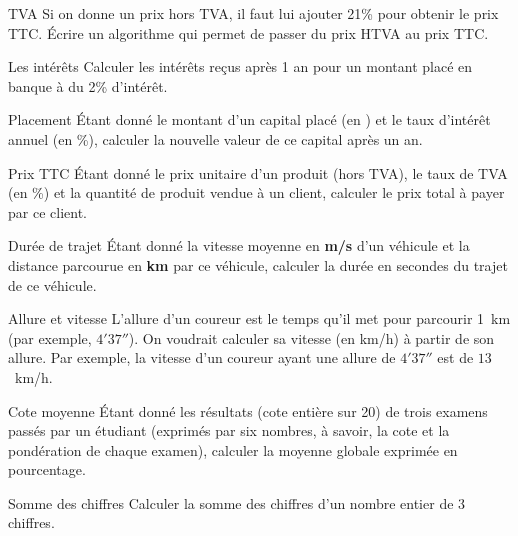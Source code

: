 		\begin{Exercice}{TVA}
			Si on donne un prix hors TVA, il faut lui ajouter 21\% 
			pour obtenir le prix TTC. Écrire un algorithme qui permet 
			de passer du prix HTVA au prix TTC.
		\end{Exercice}
	
		\begin{Exercice}{Les intérêts}
			Calculer les intérêts reçus après 1 an pour un montant placé en 
			banque à du 2\% d’intérêt.
		\end{Exercice}
	
		\begin{Exercice}{Placement}
			Étant donné le montant d’un capital placé (en \texteuro) 
			et le taux d’intérêt annuel (en \%), 
			calculer la nouvelle valeur de ce capital après un an.
		\end{Exercice}
	
		\begin{Exercice}{Prix TTC}
			Étant donné le prix unitaire d’un produit
			(hors TVA), le taux de TVA (en \%) et la quantité de produit vendue à
			un client, calculer le prix total à payer par ce client.
		\end{Exercice}
	
		\begin{Exercice}{Durée de trajet}
			Étant donné la vitesse moyenne en \textbf{m/s}
			d’un véhicule et la distance parcourue en \textbf{km} par ce véhicule,
			calculer la durée en secondes du trajet de ce véhicule.
		\end{Exercice}
	
		\begin{Exercice}{Allure et vitesse}
			L’allure d’un coureur est le temps qu’il met pour parcourir 1~km
			(par exemple, $4'37''$).
			On voudrait calculer sa vitesse (en km/h) à partir de son allure.
			Par exemple, la vitesse d’un coureur ayant une allure de
			$4'37''$ est de $13$~km/h. 
		\end{Exercice}
	
		\begin{Exercice}{Cote moyenne}
			Étant donné les résultats (cote entière sur
			20) de trois examens passés par un étudiant (exprimés par six nombres,
			à savoir, la cote et la pondération de chaque examen), calculer 
			la moyenne globale exprimée en pourcentage.
		\end{Exercice}
	
		\begin{Exercice}{Somme des chiffres}
			Calculer la somme des chiffres
			d’un nombre entier de 3 chiffres.
		\end{Exercice}
	
